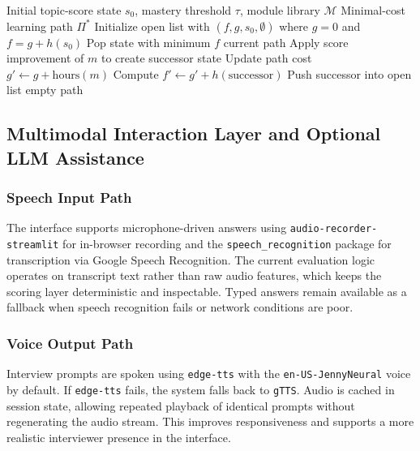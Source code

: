 \documentclass[conference]{IEEEtran}
\begin{document}
\begin{algorithm}[t]
\caption{A*-Driven Learning Path Synthesis}
\label{alg:astar}
\begin{algorithmic}[1]
\Require Initial topic-score state $s_0$, mastery threshold $\tau$, module library $\mathcal{M}$
\Ensure Minimal-cost learning path $\Pi^*$
\State Initialize open list with $(f,g,s_0,\emptyset)$ where $g=0$ and $f=g+h(s_0)$
    \State Pop state with minimum $f$
        \State \Return current path
    \EndIf
        \State Apply score improvement of $m$ to create successor state
        \State Update path cost $g' \gets g + \mathrm{hours}(m)$
        \State Compute $f' \gets g' + h(\mathrm{successor})$
        \State Push successor into open list
    \EndFor
\EndWhile
\State \Return empty path
\end{algorithmic}
\end{algorithm}

\subsection{Multimodal Interaction Layer and Optional LLM Assistance}
\subsubsection{Speech Input Path}
The interface supports microphone-driven answers using \texttt{audio-recorder-streamlit} for in-browser recording and the \texttt{speech\_recognition} package for transcription via Google Speech Recognition. The current evaluation logic operates on transcript text rather than raw audio features, which keeps the scoring layer deterministic and inspectable. Typed answers remain available as a fallback when speech recognition fails or network conditions are poor.

\subsubsection{Voice Output Path}
Interview prompts are spoken using \texttt{edge-tts} with the \texttt{en-US-JennyNeural} voice by default. If \texttt{edge-tts} fails, the system falls back to \texttt{gTTS}. Audio is cached in session state, allowing repeated playback of identical prompts without regenerating the audio stream. This improves responsiveness and supports a more realistic interviewer presence in the interface.
\end{document}
